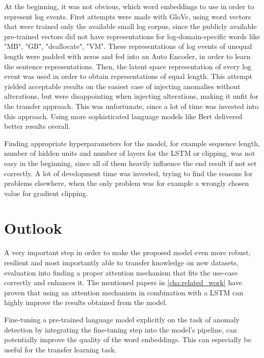 At the beginning, it was not obvious, which word embeddings to use in order to represent log events. First attempts were made with GloVe, using word vectors that were trained only the available small log corpus, since the publicly available pre-trained vectors did not have representations for log-domain-specific words like "MB", "GB", "deallocate", "VM". These representations of log events of unequal length were padded with zeros and fed into an Auto Encoder, in order to learn the sentence representations. Then, the latent space representation of every log event was used in order to obtain representations of equal length. This attempt yielded acceptable results on the easiest case of injecting anomalies without alterations, but were disappointing when injecting alterations, making it unfit for the transfer approach. This was unfortunate, since a lot of time was invested into this approach. Using more sophisticated language models like Bert delivered better results overall.

Finding appropriate hyperparameters for the model, for example sequence length, number of hidden units and number of layers for the LSTM or clipping, was not easy in the beginning, since all of them heavily influence the end result if not set correctly. A lot of development time was invested, trying to find the reasons for problems elsewhere, when the only problem was for example a wrongly chosen value for gradient clipping.

\section{Outlook\label{sec:outlook}}
A very important step in order to make the proposed model even more robust, resilient and most importantly able to transfer knowledge on new datasets, evaluation into finding a proper attention mechanism that fits the use-case correctly and enhances it. The mentioned papers in \ref{cha:related_work} have proven that using an attention mechanism in combination with a LSTM can highly improve the results obtained from the model.

Fine-tuning a pre-trained language model explicitly on the task of anomaly detection by integrating the fine-tuning step into the model's pipeline, can potentially improve the quality of the word embeddings. This can especially be useful for the transfer learning task.



